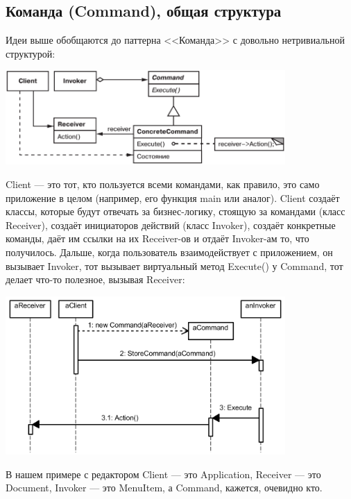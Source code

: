 \documentclass{../../text-style}
\begin{document}
\subsection{Команда (Command), общая структура}

Идеи выше обобщаются до паттерна <<Команда>> с довольно нетривиальной структурой:

\begin{center}
    \includegraphics[width=0.8\textwidth]{command.png}
\end{center}

Client --- это тот, кто пользуется всеми командами, как правило, это само приложение в целом (например, его функция main или аналог). Client создаёт классы, которые будут отвечать за бизнес-логику, стоящую за командами (класс Receiver), создаёт инициаторов действий (класс Invoker), создаёт конкретные команды, даёт им ссылки на их Receiver-ов и отдаёт Invoker-ам то, что получилось. Дальше, когда пользователь взаимодействует с приложением, он вызывает Invoker, тот вызывает виртуальный метод Execute() у Command, тот делает что-то полезное, вызывая Receiver:

\begin{center}
    \includegraphics[width=0.8\textwidth]{commandSequence.png}
\end{center}

В нашем примере с редактором Client --- это Application, Receiver --- это Document, Invoker --- это MenuItem, а Command, кажется, очевидно кто.
\end{document}
